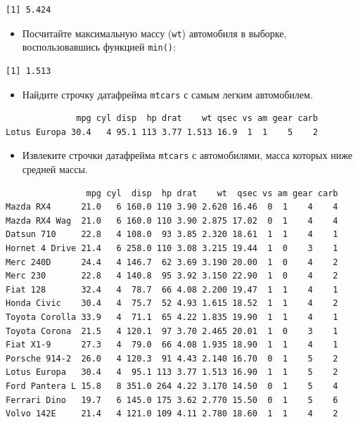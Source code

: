 \documentclass[
]{book}
\providecommand{\tightlist}{%
  \setlength{\itemsep}{0pt}\setlength{\parskip}{0pt}}
\begin{document}
\begin{verbatim}
[1] 5.424
\end{verbatim}

\begin{itemize}
\tightlist
\item
  Посчитайте максимальную массу (\texttt{wt}) автомобиля в выборке, воспользовавшись функцией \texttt{min()}:
\end{itemize}

\begin{verbatim}
[1] 1.513
\end{verbatim}

\begin{itemize}
\tightlist
\item
  Найдите строчку датафрейма \texttt{mtcars} с самым легким автомобилем.
\end{itemize}

\begin{verbatim}
              mpg cyl disp  hp drat    wt qsec vs am gear carb
Lotus Europa 30.4   4 95.1 113 3.77 1.513 16.9  1  1    5    2
\end{verbatim}

\begin{itemize}
\tightlist
\item
  Извлеките строчки датафрейма \texttt{mtcars} с автомобилями, масса которых ниже средней массы.
\end{itemize}

\begin{verbatim}
                mpg cyl  disp  hp drat    wt  qsec vs am gear carb
Mazda RX4      21.0   6 160.0 110 3.90 2.620 16.46  0  1    4    4
Mazda RX4 Wag  21.0   6 160.0 110 3.90 2.875 17.02  0  1    4    4
Datsun 710     22.8   4 108.0  93 3.85 2.320 18.61  1  1    4    1
Hornet 4 Drive 21.4   6 258.0 110 3.08 3.215 19.44  1  0    3    1
Merc 240D      24.4   4 146.7  62 3.69 3.190 20.00  1  0    4    2
Merc 230       22.8   4 140.8  95 3.92 3.150 22.90  1  0    4    2
Fiat 128       32.4   4  78.7  66 4.08 2.200 19.47  1  1    4    1
Honda Civic    30.4   4  75.7  52 4.93 1.615 18.52  1  1    4    2
Toyota Corolla 33.9   4  71.1  65 4.22 1.835 19.90  1  1    4    1
Toyota Corona  21.5   4 120.1  97 3.70 2.465 20.01  1  0    3    1
Fiat X1-9      27.3   4  79.0  66 4.08 1.935 18.90  1  1    4    1
Porsche 914-2  26.0   4 120.3  91 4.43 2.140 16.70  0  1    5    2
Lotus Europa   30.4   4  95.1 113 3.77 1.513 16.90  1  1    5    2
Ford Pantera L 15.8   8 351.0 264 4.22 3.170 14.50  0  1    5    4
Ferrari Dino   19.7   6 145.0 175 3.62 2.770 15.50  0  1    5    6
Volvo 142E     21.4   4 121.0 109 4.11 2.780 18.60  1  1    4    2
\end{verbatim}
\end{document}
